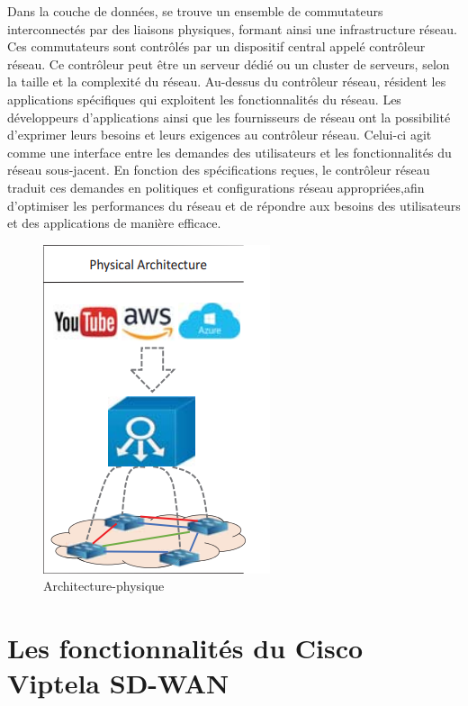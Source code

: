 Dans la couche de données, se trouve un ensemble de commutateurs interconnectés par des liaisons physiques, formant ainsi une infrastructure réseau. Ces commutateurs sont contrôlés par un dispositif central appelé contrôleur réseau. Ce contrôleur peut être un serveur dédié ou un cluster de serveurs, selon la taille et la complexité du réseau. Au-dessus du contrôleur réseau, résident les applications spécifiques qui exploitent les fonctionnalités du réseau.
Les développeurs d'applications ainsi que les fournisseurs de réseau ont la possibilité d'exprimer leurs besoins et leurs exigences au contrôleur réseau. Celui-ci agit comme une interface entre les demandes des utilisateurs et les fonctionnalités du réseau sous-jacent. En fonction des spécifications reçues, le contrôleur réseau traduit ces demandes en politiques et configurations réseau appropriées,afin d'optimiser les performances du réseau et de répondre aux besoins des utilisateurs et des applications de manière efficace. 
	\begin{figure} [H]
	\begin{center}
		\centering
		\hspace*{-0.5cm}
\includegraphics{../image/arch phy}
	\end{center}
	\caption{Architecture-physique}
\end{figure} 




\section{Les fonctionnalités du Cisco Viptela SD-WAN }


